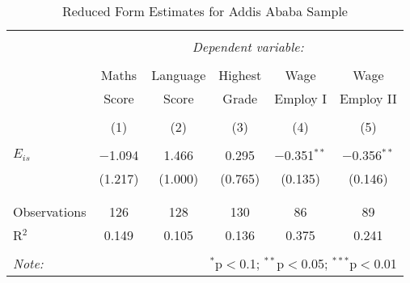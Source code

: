 

\begin{table}[!htbp] \centering 
  \caption{Reduced Form Estimates for Addis Ababa Sample} 
  \label{} 
\begin{tabular}{@{\extracolsep{5pt}}lccccc} 
\\[-1.8ex]\hline 
\hline \\[-1.8ex] 
 & \multicolumn{5}{c}{\textit{Dependent variable:}} \\ 
\cline{2-6} 
\\[-1.8ex] & Maths & Language & Highest & Wage & Wage \\ 
 & Score & Score & Grade & Employ I & Employ II \\
\\[-1.8ex] & (1) & (2) & (3) & (4) & (5)\\ 
\hline \\[-1.8ex] 
 $E_{is}$ & $-$1.094 & 1.466 & 0.295 & $-$0.351$^{**}$ & $-$0.356$^{**}$ \\ 
  & (1.217) & (1.000) & (0.765) & (0.135) & (0.146) \\ 
  & & & & & \\ 
\hline \\[-1.8ex] 
Observations & 126 & 128 & 130 & 86 & 89 \\ 
R$^{2}$ & 0.149 & 0.105 & 0.136 & 0.375 & 0.241 \\ 
\hline 
\hline \\[-1.8ex] 
\textit{Note:}  & \multicolumn{5}{r}{$^{*}$p$<$0.1; $^{**}$p$<$0.05; $^{***}$p$<$0.01} \\ 
\end{tabular} 
\end{table} 



